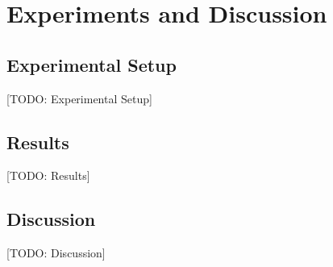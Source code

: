 \chapter{Experiments and Discussion}
\section{Experimental Setup}
[TODO: Experimental Setup]

\section{Results}
[TODO: Results]

\section{Discussion}
[TODO: Discussion]

